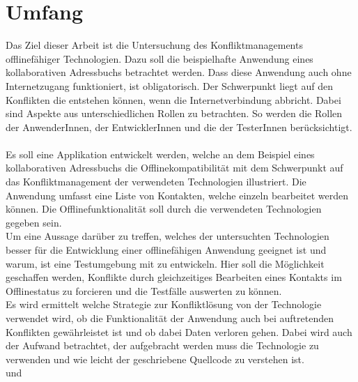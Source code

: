 \section{Umfang}
Das Ziel dieser Arbeit ist die Untersuchung des Konfliktmanagements offlinefähiger Technologien. Dazu soll die beispielhafte Anwendung eines kollaborativen Adressbuchs betrachtet werden. Dass diese Anwendung auch ohne Internetzugang funktioniert, ist obligatorisch.
Der Schwerpunkt liegt auf den Konflikten die entstehen können, wenn die Internetverbindung abbricht. Dabei sind Aspekte aus unterschiedlichen Rollen zu betrachten. So werden die Rollen der AnwenderInnen, der EntwicklerInnen und die der TesterInnen berücksichtigt.\\\\
Es soll eine Applikation entwickelt werden, welche an dem Beispiel eines kollaborativen Adressbuchs die Offlinekompatibilität mit dem Schwerpunkt auf das Konfliktmanagement der verwendeten Technologien illustriert.  Die Anwendung umfasst eine Liste von Kontakten, welche einzeln bearbeitet werden können. Die Offlinefunktionalität soll durch die verwendeten Technologien gegeben sein.\\
Um eine Aussage darüber zu treffen, welches der untersuchten Technologien besser für die Entwicklung einer offlinefähigen Anwendung geeignet ist und warum, ist eine Testumgebung mit zu entwickeln. Hier soll die Möglichkeit geschaffen werden, Konflikte durch gleichzeitiges Bearbeiten eines Kontakts im Offlinestatus zu forcieren und die Testfälle auswerten zu können. \\
Es wird ermittelt welche Strategie zur Konfliktlösung von der Technologie verwendet wird, ob die Funktionalität der Anwendung auch bei auftretenden Konflikten gewährleistet ist und ob dabei Daten verloren gehen.
Dabei wird auch der Aufwand betrachtet, der aufgebracht werden muss die Technologie zu verwenden und wie leicht der geschriebene Quellcode zu verstehen ist.\\
 und 